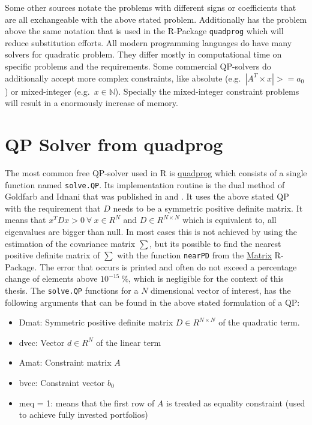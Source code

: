 \documentclass[
  oneside]{book}
\providecommand{\tightlist}{%
  \setlength{\itemsep}{0pt}\setlength{\parskip}{0pt}}
\begin{document}
Some other sources notate the problems with different signs or coefficients that are all exchangeable with the above stated problem. Additionally has the problem above the same notation that is used in the R-Package \texttt{quadprog} which will reduce substitution efforts. All modern programming languages do have many solvers for quadratic problem. They differ mostly in computational time on specific problems and the requirements. Some commercial QP-solvers do additionally accept more complex constraints, like absolute (e.g.~\(|A^T \times x| >= a_0\)) or mixed-integer (e.g.~\(x \in \mathbb{N}\)). Specially the mixed-integer constraint problems will result in a enormously increase of memory.

\hypertarget{qp-solver-from-quadprog}{%
\section{QP Solver from quadprog}\label{qp-solver-from-quadprog}}

The most common free QP-solver used in R is \href{https://cran.r-project.org/web/packages/quadprog/quadprog.pdf}{quadprog} which consists of a single function named \texttt{solve.QP}. Its implementation routine is the dual method of Goldfarb and Idnani that was published in \citep{GoId1982} and \citep{GoId1983}. It uses the above stated QP with the requirement that \(D\) needs to be a symmetric positive definite matrix. It means that \(x^T D x > 0 \ \forall \ x \in R^N\) and \(D\in R^{N \times N}\) which is equivalent to, all eigenvalues are bigger than null. In most cases this is not achieved by using the estimation of the covariance matrix \(\sum\), but its possible to find the nearest positive definite matrix of \(\sum\) with the function \texttt{nearPD} from the \href{https://cran.r-project.org/web/packages/Matrix/Matrix.pdf}{Matrix} R-Package. The error that occurs is printed and often do not exceed a percentage change of elements above \(10^{-15} \ \%\), which is negligible for the context of this thesis. The \texttt{solve.QP} functions for a \(N\) dimensional vector of interest, has the following arguments that can be found in the above stated formulation of a QP:

\begin{itemize}
\tightlist
\item
  Dmat: Symmetric positive definite matrix \(D \in R^{N \times N}\) of the quadratic term.
\item
  dvec: Vector \(d \in R^{N}\) of the linear term
\item
  Amat: Constraint matrix \(A\)
\item
  bvec: Constraint vector \(b_0\)
\item
  meq = 1: means that the first row of \(A\) is treated as equality constraint (used to achieve fully invested portfolios)
\end{itemize}
\end{document}
